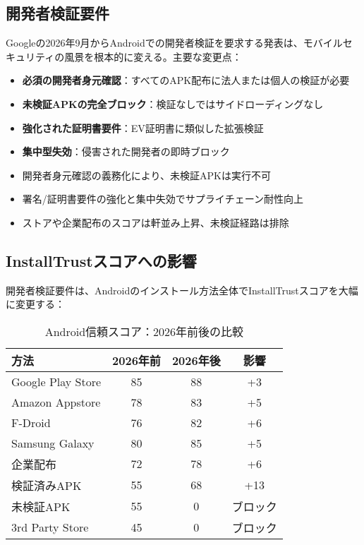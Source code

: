 \documentclass[Specialissue]{jsaiart}
\begin{document}
\subsection{開発者検証要件}

Googleの2026年9月からAndroidでの開発者検証を要求する発表は、モバイルセキュリティの風景を根本的に変える\cite{google2025android}。主要な変更点：

\begin{itemize}
    \item \textbf{必須の開発者身元確認}：すべてのAPK配布に法人または個人の検証が必要
    \item \textbf{未検証APKの完全ブロック}：検証なしではサイドローディングなし
    \item \textbf{強化された証明書要件}：EV証明書に類似した拡張検証
\item \textbf{集中型失効}：侵害された開発者の即時ブロック
\end{itemize}

\begin{callout}
\begin{itemize}
  \item 開発者身元確認の義務化により、未検証APKは実行不可
  \item 署名/証明書要件の強化と集中失効でサプライチェーン耐性向上
  \item ストアや企業配布のスコアは軒並み上昇、未検証経路は排除
\end{itemize}
\end{callout}

\subsection{InstallTrustスコアへの影響}

開発者検証要件は、Androidのインストール方法全体でInstallTrustスコアを大幅に変更する：

\begin{table}[ht]
\centering
\caption{Android信頼スコア：2026年前後の比較}
\begin{tabular}{lccc}
\toprule
\rowcolor{headergray}
\textbf{方法} & \textbf{2026年前} & \textbf{2026年後} & \textbf{影響} \\
\midrule
Google Play Store & 85 & 88 & +3 \\
Amazon Appstore & 78 & 83 & +5 \\
F-Droid & 76 & 82 & +6 \\
Samsung Galaxy & 80 & 85 & +5 \\
企業配布 & 72 & 78 & +6 \\
検証済みAPK & 55 & 68 & +13 \\
未検証APK & 55 & 0 & ブロック \\
3rd Party Store & 45 & 0 & ブロック \\
\bottomrule
\end{tabular}
\end{table}
\end{document}
